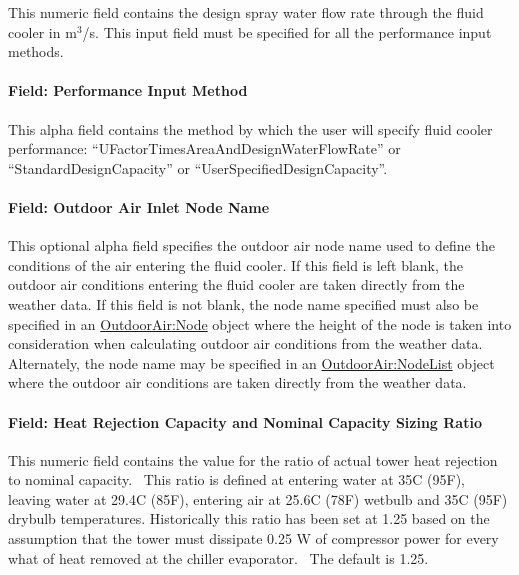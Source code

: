 This numeric field contains the design spray water flow rate through the fluid cooler in m\(^{3}\)/s. This input field must be specified for all the performance input methods.

\paragraph{Field: Performance Input Method}\label{field-performance-input-method-4}

This alpha field contains the method by which the user will specify fluid cooler performance: ``UFactorTimesAreaAndDesignWaterFlowRate'' or ``StandardDesignCapacity'' or ``UserSpecifiedDesignCapacity''.

\paragraph{Field: Outdoor Air Inlet Node Name}\label{field-outdoor-air-inlet-node-name-5}

This optional alpha field specifies the outdoor air node name used to define the conditions of the air entering the fluid cooler. If this field is left blank, the outdoor air conditions entering the fluid cooler are taken directly from the weather data. If this field is not blank, the node name specified must also be specified in an \hyperref[outdoorairnode]{OutdoorAir:Node} object where the height of the node is taken into consideration when calculating outdoor air conditions from the weather data. Alternately, the node name may be specified in an \hyperref[outdoorairnodelist]{\hyperref[outdoorairnode]{OutdoorAir:Node}List} object where the outdoor air conditions are taken directly from the weather data.

\paragraph{Field: Heat Rejection Capacity and Nominal Capacity Sizing Ratio}\label{field-heat-rejection-capacity-and-nominal-capacity-sizing-ratio-4}

This numeric field contains the value for the ratio of actual tower heat rejection to nominal capacity.~ This ratio is defined at entering water at 35C (95F), leaving water at 29.4C (85F), entering air at 25.6C (78F) wetbulb and 35C (95F) drybulb temperatures. Historically this ratio has been set at 1.25 based on the assumption that the tower must dissipate 0.25 W of compressor power for every what of heat removed at the chiller evaporator.~ The default is 1.25.

